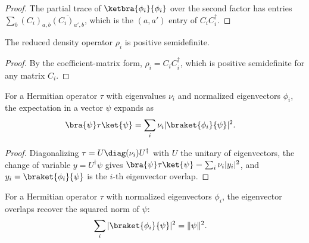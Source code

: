 \begin{proof}
    \leanok
    The partial trace of $\ketbra{\phi_i}{\phi_i}$ over the second factor has
    entries $\sum_b(C_i)_{a,b}\overline{(C_i)_{a',b}}$, which is the
    $(a,a')$ entry of $C_iC_i^\dagger$.
\end{proof}

\begin{lemma}
    \label{lem:reduced_eig_density_posSemidef}
    \leanok
    The reduced density operator $\rho_i$ is positive semidefinite.
\end{lemma}

\begin{proof}
    \leanok
    By the coefficient-matrix form, $\rho_i=C_iC_i^\dagger$, which is positive
    semidefinite for any matrix $C_i$.
\end{proof}

\begin{lemma}
    \label{lem:eigenbasis_rayleigh}
    \leanok
    For a Hermitian operator $\tau$ with eigenvalues $\nu_i$ and normalized
    eigenvectors $\phi_i$, the expectation in a vector $\psi$ expands as
    \begin{align}
        \bra{\psi}\tau\ket{\psi}
         & =\sum_i\nu_i|\braket{\phi_i}{\psi}|^2.
        \label{eq:schwarz_eigenbasis_rayleigh}
    \end{align}
\end{lemma}

\begin{proof}
    \leanok
    Diagonalizing $\tau=U\diag(\nu_i)U^\dagger$ with $U$ the unitary of
    eigenvectors, the change of variable $y=U^\dagger\psi$ gives
    $\bra{\psi}\tau\ket{\psi}=\sum_i\nu_i|y_i|^2$, and
    $y_i=\braket{\phi_i}{\psi}$ is the $i$-th eigenvector overlap.
\end{proof}

\begin{lemma}
    \label{lem:eigenbasis_parseval}
    \leanok
    For a Hermitian operator $\tau$ with normalized eigenvectors $\phi_i$, the
    eigenvector overlaps recover the squared norm of $\psi$:
    \begin{align}
        \sum_i|\braket{\phi_i}{\psi}|^2
         & =\|\psi\|^2.
        \label{eq:schwarz_eigenbasis_parseval}
    \end{align}
\end{lemma}

